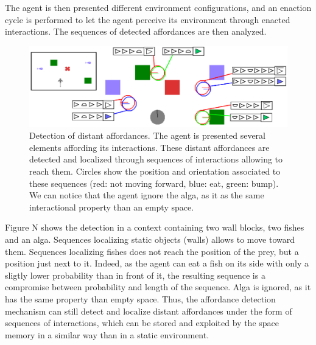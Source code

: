 \documentclass[conference]{IEEEtran}
\begin{document}
The agent is then presented different environment configurations, and an enaction cycle is performed to let the agent perceive its environment through enacted interactions. The sequences of detected affordances are then analyzed.





\begin{figure}[htbp]
\centerline{\includegraphics[scale=0.45]{img/detection.pdf}}
\caption{Detection of distant affordances. The agent is presented several elements affording its interactions. These distant affordances are detected and localized through sequences of interactions allowing to reach them. Circles show the position and orientation associated to these sequences (red: not moving forward, blue: eat, green: bump). We can notice that the agent ignore the alga, as it as the same interactional property than an empty space.}
\label{fig}
\end{figure}

Figure N shows the detection in a context containing two wall blocks, two fishes and an alga. Sequences localizing static objects (walls) allows to move toward them. Sequences localizing fishes does not reach the position of the prey, but a position just next to it. Indeed, as the agent can eat a fish on its side with only a sligtly lower probability than in front of it, the resulting sequence is a compromise between probability and length of the sequence. Alga is ignored, as it has the same property than empty space. Thus, the affordance detection mechanism can still detect and localize distant affordances under the form of sequences of interactions, which can be stored and exploited by the space memory in a similar way than in a static environment.
\end{document}
